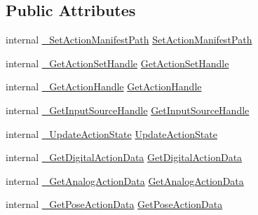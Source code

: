 \subsection*{Public Attributes}
\begin{DoxyCompactItemize}
\item 
internal \mbox{\hyperlink{struct_valve_1_1_v_r_1_1_i_v_r_input_abe386c0a304c243f737dbfda0340428a}{\+\_\+\+Set\+Action\+Manifest\+Path}} \mbox{\hyperlink{struct_valve_1_1_v_r_1_1_i_v_r_input_a7033cdf7a211cd1953ccbf1a266c9adc}{Set\+Action\+Manifest\+Path}}
\item 
internal \mbox{\hyperlink{struct_valve_1_1_v_r_1_1_i_v_r_input_ab3c6223a018a82a60946167267376579}{\+\_\+\+Get\+Action\+Set\+Handle}} \mbox{\hyperlink{struct_valve_1_1_v_r_1_1_i_v_r_input_a3a9b1c169571d3460bca2ac31de90d4a}{Get\+Action\+Set\+Handle}}
\item 
internal \mbox{\hyperlink{struct_valve_1_1_v_r_1_1_i_v_r_input_a21380aa596ca906ff4b10666cf88065e}{\+\_\+\+Get\+Action\+Handle}} \mbox{\hyperlink{struct_valve_1_1_v_r_1_1_i_v_r_input_a6cba75e1409add3973f61efe2a72c129}{Get\+Action\+Handle}}
\item 
internal \mbox{\hyperlink{struct_valve_1_1_v_r_1_1_i_v_r_input_a60fb16bdfa85d70a30f566ddd0c52fe2}{\+\_\+\+Get\+Input\+Source\+Handle}} \mbox{\hyperlink{struct_valve_1_1_v_r_1_1_i_v_r_input_a04088eb27474e4d6964ff49df0d96aa8}{Get\+Input\+Source\+Handle}}
\item 
internal \mbox{\hyperlink{struct_valve_1_1_v_r_1_1_i_v_r_input_a71824d045beb4928cad94006a0e435a6}{\+\_\+\+Update\+Action\+State}} \mbox{\hyperlink{struct_valve_1_1_v_r_1_1_i_v_r_input_a73f51af53c4da446957dbfcbab005233}{Update\+Action\+State}}
\item 
internal \mbox{\hyperlink{struct_valve_1_1_v_r_1_1_i_v_r_input_a376552d06df56ac9589e5014e3f04908}{\+\_\+\+Get\+Digital\+Action\+Data}} \mbox{\hyperlink{struct_valve_1_1_v_r_1_1_i_v_r_input_a77204548e75501e650980f77a8516ba7}{Get\+Digital\+Action\+Data}}
\item 
internal \mbox{\hyperlink{struct_valve_1_1_v_r_1_1_i_v_r_input_a3e6eea8d879b201cac5deced936b5298}{\+\_\+\+Get\+Analog\+Action\+Data}} \mbox{\hyperlink{struct_valve_1_1_v_r_1_1_i_v_r_input_abfadd0b1ea3647fa3484a0bb65aa4e82}{Get\+Analog\+Action\+Data}}
\item 
internal \mbox{\hyperlink{struct_valve_1_1_v_r_1_1_i_v_r_input_aeb5a782b37d5126d81e5a1a21fa69500}{\+\_\+\+Get\+Pose\+Action\+Data}} \mbox{\hyperlink{struct_valve_1_1_v_r_1_1_i_v_r_input_af8e2e899374e4363ebfb682372073ac2}{Get\+Pose\+Action\+Data}}

\end{DoxyCompactItemize}
